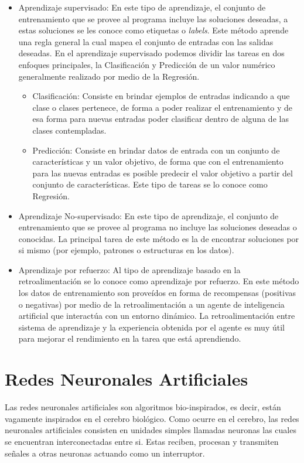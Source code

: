 \begin{itemize}
    \item Aprendizaje supervisado: En este tipo de aprendizaje, el conjunto de entrenamiento que se provee al programa incluye las soluciones deseadas, a estas soluciones se les conoce como etiquetas o \textit{labels}. Este método aprende una regla general la cual mapea el conjunto de entradas con las salidas deseadas.
    En el aprendizaje supervisado podemos dividir las tareas en dos enfoques principales, la Clasificación y Predicción de un valor numérico generalmente realizado por medio de la Regresión. 

    \begin{itemize}
        \item Clasificación: Consiste en brindar ejemplos de entradas indicando a que clase o clases pertenece, de forma a poder realizar el entrenamiento y de esa forma para nuevas entradas poder clasificar dentro de alguna de las clases contempladas.
        \item Predicción: Consiste en brindar datos de entrada con un conjunto de características y un valor objetivo, de forma que con el entrenamiento para las nuevas entradas es posible predecir el valor objetivo a partir del conjunto de características. Este tipo de tareas se lo conoce como Regresión.
    \end{itemize}
    \item Aprendizaje No-supervisado: En este tipo de  aprendizaje, el conjunto de entrenamiento que se provee al programa no incluye las soluciones deseadas o conocidas. La principal tarea de este método es la de encontrar soluciones por si mismo (por ejemplo, patrones o estructuras en los datos).
    \item Aprendizaje por refuerzo: Al tipo de aprendizaje basado en la retroalimentación se lo conoce como aprendizaje por refuerzo. En este método los datos de entrenamiento son proveídos en forma de recompensas (positivas o negativas) por medio de la retroalimentación a un agente de inteligencia artificial que interactúa con un entorno dinámico. La retroalimentación entre sistema de aprendizaje y la experiencia obtenida por el agente es muy útil para mejorar el rendimiento en la tarea que está aprendiendo.
\end{itemize}

\section{Redes Neuronales Artificiales}
Las redes neuronales artificiales son algoritmos bio-inspirados, es decir, están vagamente inspirados en el cerebro biológico. Como ocurre en el cerebro, las redes neuronales artificiales consisten en unidades simples llamadas neuronas las cuales se encuentran interconectadas entre si. Estas reciben, procesan y transmiten señales a otras neuronas actuando como un interruptor.


